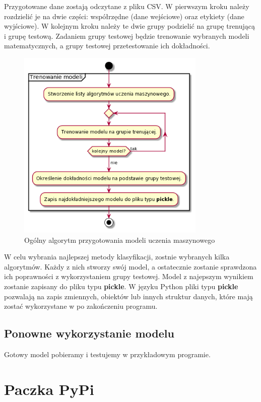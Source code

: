     \quad Przygotowane dane zostają odczytane z pliku CSV. W pierwszym kroku należy rozdzielić je na dwie części: współrzędne (dane wejściowe) oraz etykiety (dane wyjściowe). W kolejnym kroku należy te dwie grupy podzielić na grupę trenującą i grupę testową. Zadaniem grupy testowej będzie trenowanie wybranych modeli matematycznych, a grupy testowej przetestowanie ich dokładności. 

    \begin{figure}[H]
        \begin{center}
            \includegraphics[width=9cm]{../images/train_models.png}
            \caption{Ogólny algorytm przygotowania modeli uczenia maszynowego}
        \end{center}
    \end{figure}
    
    \quad W celu wybrania najlepszej metody klasyfikacji, zostnie wybranych kilka algorytmów. Każdy z nich stworzy swój model, a ostatecznie zostanie sprawdzona ich poprawności z wykorzystaniem grupy testowej. Model z najepszym wynikiem zostanie zapisany do pliku typu \textbf{pickle}. W języku Python pliki typu \textbf{pickle} pozwalają na zapis zmiennych, obiektów lub innych struktur danych, które mają zostać wykorzystane w po zakończeniu programu. 
    
    \subsection{Ponowne wykorzystanie modelu}
    
    \quad Gotowy model pobieramy i testujemy w przykładowym programie. 
    
    \section{Paczka PyPi}

